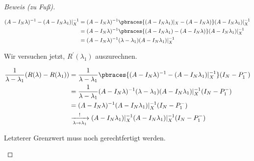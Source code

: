 \begin{proof}[Beweis (zu Fuß)]
\begin{enumerate}[label = (\roman*)]
        \begin{align*}
            (A - I_N \lambda)^{-1}
            -
            (A - I_N \lambda_1) |_X^{-1}
            & =
            (A - I_N \lambda)^{-1}
            \pbraces
            {
                (A - I_N \lambda_1) |_X
                -
                (A - I_N \lambda)
            }
            (A - I_N \lambda_1) |_X^{-1} \\
            & =
            (A - I_N \lambda)^{-1}
            \pbraces
            {
                (A - I_N \lambda_1)
                -
                (A - I_N \lambda)
            }
            (A - I_N \lambda_1) |_X^{-1} \\
            & =
            (A - I_N \lambda)^{-1}
            (\lambda - \lambda_1)
            (A - I_N \lambda_1) |_X^{-1}
        \end{align*}

        Wir versuchen jetzt, $R^\prime(\lambda_1)$ auszurechnen.

        \begin{align*}
            \frac{1}{\lambda - \lambda_1}
            (R(\lambda) - R(\lambda_1))
            & =
            \frac{1}{\lambda - \lambda_1}
            \pbraces
            {
                (A - I_N \lambda)^{-1}
                -
                (A - I_N \lambda_1) |_X^{-1}
            }
            (I_N - P_1^-) \\
            & =
            \frac{1}{\lambda - \lambda_1}
            (A - I_N \lambda)^{-1}
            (\lambda - \lambda_1)
            (A - I_N \lambda_1) |_X^{-1}
            (I_N - P_1^-) \\
            & =
            (A - I_N \lambda)^{-1}
            (A - I_N \lambda_1) |_X^{-1}
            (I_N - P_1^-) \\
            & \xrightarrow[\lambda \to \lambda_1]{!}
            (A - I_N \lambda_1) |_X^{-1}
            (A - I_N \lambda_1) |_X^{-1}
            (I_N - P_1^-)
        \end{align*}

        Letzterer Grenzwert muss noch gerechtfertigt werden.


\end{enumerate}
\end{proof}
